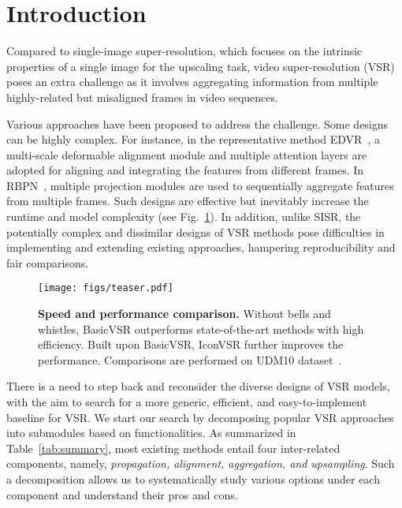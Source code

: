 \documentclass[final]{cvpr}
\begin{document}
\section{Introduction}
Compared to single-image super-resolution, which focuses on the intrinsic properties of a single image for the upscaling task, video super-resolution (VSR) poses an extra challenge as it involves aggregating information from multiple highly-related but misaligned frames in video sequences.

Various approaches have been proposed to address the challenge. Some designs can be highly complex. For instance, in the representative method EDVR~\cite{wang2019edvr}, a multi-scale deformable alignment module and multiple attention layers are adopted for aligning and integrating the features from different frames. In RBPN~\cite{haris2019recurrent}, multiple projection modules are used to sequentially aggregate features from multiple frames.
Such designs are effective but inevitably increase the runtime and model complexity (see Fig.~\ref{fig:teaser}).
In addition, unlike SISR, the potentially complex and dissimilar designs of VSR methods pose difficulties in implementing and extending existing approaches, hampering reproducibility and fair comparisons.

\begin{figure}[t]
	\begin{center}
		\texttt{[image: figs/teaser.pdf]}
		\caption{\textbf{Speed and performance comparison.} Without bells and whistles, \mbox{BasicVSR} outperforms state-of-the-art methods with high efficiency. Built upon \mbox{BasicVSR}, \mbox{IconVSR} further improves the performance. Comparisons are performed on UDM10 dataset~\cite{yi2019progressive}.}
		\vskip -0.7cm
		\label{fig:teaser}
	\end{center}
\end{figure}

There is a need to step back and reconsider the diverse designs of VSR models, with the aim to search for a more generic, efficient, and easy-to-implement baseline for VSR.
We start our search by decomposing popular VSR approaches into submodules based on functionalities. As summarized in Table~\ref{tab:summary}, most existing methods entail four inter-related components, namely, \textit{propagation, alignment, aggregation, and upsampling}.
Such a decomposition allows us to systematically study various options under each component and understand their pros and cons.
\end{document}
